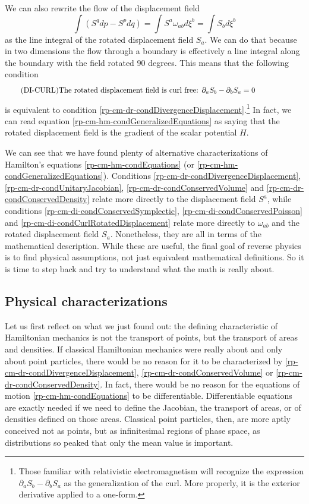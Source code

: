We can also rewrite the flow of the displacement field
\begin{equation}
	\int \left( S^q dp - S^p dq \right) = \int S^a \omega_{ab} d\xi^b = \int S_b d\xi^b
\end{equation}
as the line integral of the rotated displacement field $S_a$. We can do that because in two dimensions the flow through a boundary is effectively a line integral along the boundary with the field rotated 90 degrees. This means that the following condition
\begin{equation}\label{rp-cm-di-condCurlRotatedDisplacement}
	\tag{DI-CURL}
	\eqtext{The rotated displacement field is curl free: $\partial_a S_b - \partial_b S_a = 0$} 
\end{equation}
is equivalent to condition \ref{rp-cm-dr-condDivergenceDisplacement}.\footnote{Those familiar with relativistic electromagnetism will recognize the expression $\partial_a S_b - \partial_b S_a$ as the generalization of the curl. More properly, it is the exterior derivative applied to a one-form.} In fact, we can read equation \ref{rp-cm-hm-condGeneralizedEquations} as saying that the rotated displacement field is the gradient of the scalar potential $H$.

We can see that we have found plenty of alternative characterizations of Hamilton's equations \ref{rp-cm-hm-condEquations} (or \ref{rp-cm-hm-condGeneralizedEquations}). Conditions  \ref{rp-cm-dr-condDivergenceDisplacement}, \ref{rp-cm-dr-condUnitaryJacobian}, \ref{rp-cm-dr-condConservedVolume} and \ref{rp-cm-dr-condConservedDensity} relate more directly to the displacement field $S^a$, while conditions \ref{rp-cm-di-condConservedSymplectic}, \ref{rp-cm-di-condConservedPoisson} and \ref{rp-cm-di-condCurlRotatedDisplacement} relate more directly to $\omega_{ab}$ and the rotated displacement field $S_a$. Nonetheless, they are all in terms of the mathematical description. While these are useful, the final goal of reverse physics is to find physical assumptions, not just equivalent mathematical definitions. So it is time to step back and try to understand what the math is really about.

\subsection{Physical characterizations}

Let us first reflect on what we just found out: the defining characteristic of Hamiltonian mechanics is not the transport of points, but the transport of areas and densities. If classical Hamiltonian mechanics were really about and only about point particles, there would be no reason for it to be characterized by \ref{rp-cm-dr-condDivergenceDisplacement}, \ref{rp-cm-dr-condConservedVolume} or \ref{rp-cm-dr-condConservedDensity}. In fact, there would be no reason for the equations of motion \ref{rp-cm-hm-condEquations} to be differentiable. Differentiable equations are exactly needed if we need to define the Jacobian, the transport of areas, or of densities defined on those areas. Classical point particles, then, are more aptly conceived not as points, but as infinitesimal regions of phase space, as distributions so peaked that only the mean value is important.

